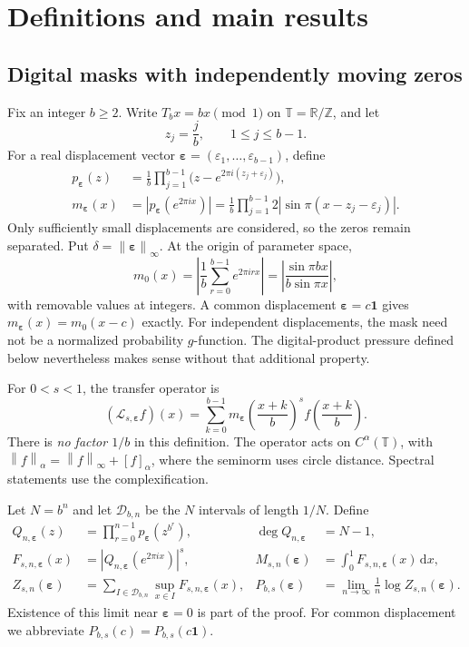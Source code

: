 \documentclass[11pt,a4paper]{article}
\numberwithin{equation}{section}
\theoremstyle{definition}
\theoremstyle{remark}
\newcommand{\TT}{\mathbb T}
\newcommand{\RR}{\mathbb R}
\newcommand{\ZZ}{\mathbb Z}
\newcommand{\dd}{\,\mathrm d}
\newcommand{\Lop}{\mathcal L}
\newcommand{\norm}[1]{\left\lVert#1\right\rVert}
\newcommand{\eps}{\boldsymbol\varepsilon}
\newcommand{\Holder}{C^\alpha(\TT)}
\begin{document}
\section{Definitions and main results}
\label{sec:main}

\subsection{Digital masks with independently moving zeros}
Fix an integer $b\geq2$. Write $T_bx=bx\pmod1$ on
$\TT=\RR/\ZZ$, and let
\[
 z_j=\frac jb,\qquad 1\leq j\leq b-1.
\]
For a real displacement vector
$\eps=(\varepsilon_1,\ldots,\varepsilon_{b-1})$, define
\begin{align}
 p_{\eps}(z)&=\frac1b\prod_{j=1}^{b-1}
       \bigl(z-e^{2\pi i(z_j+\varepsilon_j)}\bigr),
       \label{eq:polynomial}\\
 m_{\eps}(x)&=|p_{\eps}(e^{2\pi i x})|
   =\frac1b\prod_{j=1}^{b-1}2|\sin\pi(x-z_j-\varepsilon_j)|.
       \label{eq:mask}
\end{align}
Only sufficiently small displacements are considered, so the zeros
remain separated. Put $\delta=\norm\eps_\infty$.
At the origin of parameter space,
\begin{equation}
 m_0(x)=\left|\frac1b\sum_{r=0}^{b-1}e^{2\pi i r x}\right|
       =\left|\frac{\sin\pi b x}{b\sin\pi x}\right|,
 \label{eq:atomic-mask}
\end{equation}
with removable values at integers. A common displacement
$\eps=c\mathbf1$ gives $m_{\eps}(x)=m_0(x-c)$ exactly.
For independent displacements, the mask need not be a normalized
probability $g$-function. The digital-product pressure defined below
nevertheless makes sense without that additional property.

For $0<s<1$, the transfer operator is
\begin{equation}
 (\Lop_{s,\eps}f)(x)=\sum_{k=0}^{b-1}
 m_{\eps}\!\left(\frac{x+k}{b}\right)^s
 f\!\left(\frac{x+k}{b}\right).
 \label{eq:operator}
\end{equation}
There is \emph{no factor $1/b$} in this definition.
The operator acts on $\Holder$, with
$\norm f_\alpha=\norm f_\infty+[f]_\alpha$, where the seminorm uses
circle distance. Spectral statements use the complexification.

Let $N=b^n$ and let $\mathcal D_{b,n}$ be the $N$ intervals of length
$1/N$. Define
\begin{align}
 Q_{n,\eps}(z)&=\prod_{r=0}^{n-1}p_{\eps}(z^{b^r}),
 &\deg Q_{n,\eps}&=N-1,\\
 F_{s,n,\eps}(x)&=|Q_{n,\eps}(e^{2\pi i x})|^s,
 &M_{s,n}(\eps)&=\int_0^1F_{s,n,\eps}(x)\dd x,\\
 Z_{s,n}(\eps)&=\sum_{I\in\mathcal D_{b,n}}
       \sup_{x\in I}F_{s,n,\eps}(x),
 &P_{b,s}(\eps)&=\lim_{n\to\infty}\frac1n\log Z_{s,n}(\eps).
 \label{eq:pressure}
\end{align}
Existence of this limit near $\eps=0$ is part of the proof.
For common displacement we abbreviate $P_{b,s}(c)=P_{b,s}(c\mathbf1)$.
\end{document}
